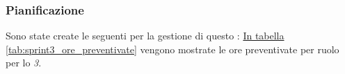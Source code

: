 \subsubsection{Pianificazione}
Sono state create le seguenti  per la gestione di questo : 
\hyperref[tab:sprint3_ore_preventivate]{In tabella \ref{tab:sprint3_ore_preventivate}} vengono mostrate le ore preventivate per ruolo per lo \textit{ 3}.

\begin{table}[H]
    \centering
    \caption{Ore preventivate per ruolo  3}
    \label{tab:sprint3_ore_preventivate}
\end{table}